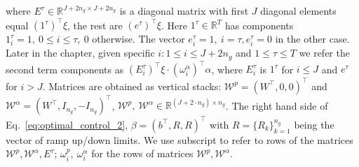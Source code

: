 where $E^\tau \in \mathbb{R}^{J+2n_g \times J + 2n_g}$ is a diagonal matrix with first $J$ diagonal elements equal $(1^\tau) ^\top \xi$, the rest are $(e^\tau)^\top\xi$. Here
$1^{\tau} \in \mathbb{R}^T$ has components $1^{\tau}_i = 1, ~ 0 \leq i \leq \tau, ~ 0$ otherwise. The vector $e^\tau_i = 1, ~ i=\tau, e^\tau_i = 0$ in the other case. Later in the chapter, given specific $i:1 \leq i \leq J + 2n_g$ and $1\leq \tau \leq T$ we refer the second term components as $(E^\tau_i)^\top\xi \cdot (\omega_i^\alpha)^\top \alpha$, where $E^\tau_i$ is $1^\tau$ for $i \leq J$ and $e^\tau$ for $i > J$.
Matrices are obtained as vertical stacks: $\mathcal{W}^p = \left( W^\top, 0, 0 \right)^\top$ and $\mathcal{W}^\alpha = \left(W^\top, I_{n_g}, -I_{n_g} \right)^\top$, $\mathcal{W}^p, ~ \mathcal{W}^\alpha \in \mathbb{R}^{(J + 2 \cdot n_g)\times n_g}$. The right hand side of Eq.~\eqref{eq:optimal_control_2}, $\beta = \left(b^\top, R, R \right)^\top$ with $R = \{R_k\}_{k=1}^{n_g}$ being the vector of ramp up/down limits. %
We use subscript to refer to rows of the matrices $\mathcal{W}^p, \mathcal{W}^\alpha, E^\tau$; $\omega_i^{p}, ~ \omega_i^{\alpha}$ for the rows of matrices $\mathcal{W}^p, \mathcal{W}^\alpha$. %
